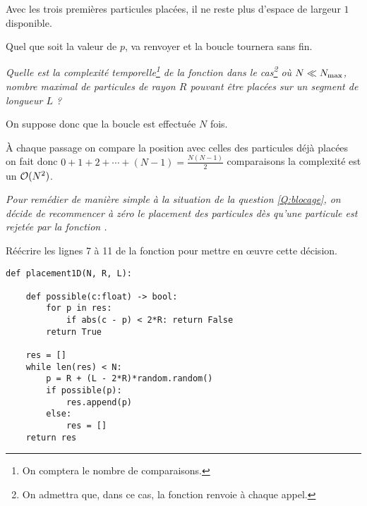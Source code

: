 \begin{Answer}

Avec les trois premières particules placées, il ne reste plus d'espace de largeur $1$ disponible. 

Quel que soit la valeur de $p$,  va renvoyer  et la boucle  tournera sans fin.
\end{Answer}
\begin{Exercise}\it 
Quelle est la complexité temporelle\footnote{On comptera le nombre de comparaisons.}
 de la fonction  dans le cas\footnote{On admettra que, dans ce cas, la fonction  renvoie  à chaque appel.} où $N \ll N_{\rm max}$, nombre maximal de particules de rayon $R$ pouvant être placées sur un segment de longueur $L$ ?
\end{Exercise}
\begin{Answer}
On suppose donc que  la boucle  est effectuée $N$ fois.

À chaque passage on compare la position avec celles des particules déjà placées on fait donc $0 + 1 + 2 + \cdots + (N-1)=\frac{N(N-1)}2$ comparaisons la complexité est un ${\cal O}(N^2)$.
\end{Answer}
\begin{Exercise}[label = Q:recommencer]\it 
Pour remédier de manière simple à la situation de la question \ref{Q:blocage}, on décide de recommencer à zéro le placement des particules dès qu'une particule est rejetée par la fonction . 

Réécrire les lignes 7 à 11 de la fonction  pour mettre en œuvre cette décision.
\end{Exercise}
\begin{Answer}
\begin{lstlisting}
def placement1D(N, R, L):
    
    def possible(c:float) -> bool:
        for p in res:
            if abs(c - p) < 2*R: return False
        return True
    
    res = []
    while len(res) < N:
        p = R + (L - 2*R)*random.random()
        if possible(p): 
            res.append(p)
        else:
            res = []
    return res
\end{lstlisting}
\end{Answer}
